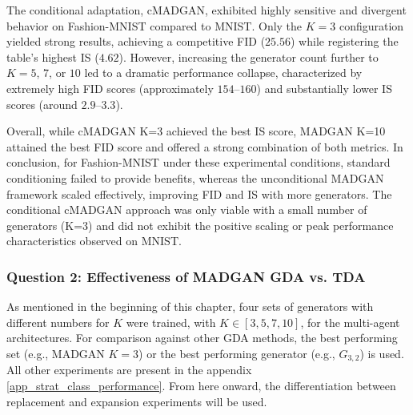 The conditional adaptation, cMADGAN, exhibited highly sensitive and divergent behavior on Fashion-MNIST compared to MNIST. Only the $K = 3$ configuration yielded strong results, achieving a competitive FID ($25.56$) while registering the table's highest IS ($4.62$). However, increasing the generator count further to $K = 5$, $7$, or $10$ led to a dramatic performance collapse, characterized by extremely high FID scores (approximately $154$–$160$) and substantially lower IS scores (around $2.9$–$3.3$).

Overall, while cMADGAN K=3 achieved the best IS score, MADGAN K=10 attained the best FID score and offered a strong combination of both metrics. In conclusion, for Fashion-MNIST under these experimental conditions, standard conditioning failed to provide benefits, whereas the unconditional MADGAN framework scaled effectively, improving FID and IS with more generators. The conditional cMADGAN approach was only viable with a small number of generators (K=3) and did not exhibit the positive scaling or peak performance characteristics observed on MNIST.

\subsubsection[Question 2]{Question 2: Effectiveness of MADGAN GDA vs. TDA}\label{exp_results_ans_q2} 
 As mentioned in the beginning of this chapter, four sets of generators with different numbers for \(K\) were trained, with \(K \in [3, 5, 7, 10]\), for the multi-agent architectures. For comparison against other GDA methods, the best performing set (e.g., MADGAN \(K=3\)) or the best performing generator (e.g., \(G_{3,2}\)) is used. All other experiments are present in the appendix \ref{app_strat_class_performance}. From here onward, the differentiation between replacement and expansion experiments will be used. 

